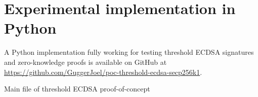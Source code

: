\chapter{Experimental implementation in Python}
\label{chap:pyImpl}

A Python implementation fully working for testing threshold ECDSA signatures and zero-knowledge proofs
is available on GitHub at \url{https://github.com/GuggerJoel/poc-threshold-ecdsa-secp256k1}.

\begin{longlisting}
	\caption{Main file of threshold ECDSA proof-of-concept}
	\label{lst:secdsaPythonPoc}
\end{longlisting}
